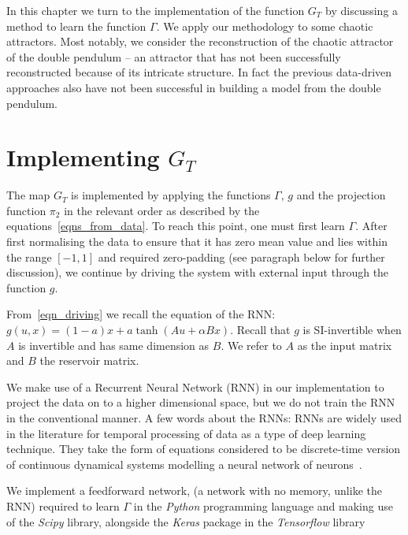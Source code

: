 In this chapter we turn to the implementation of the function $G_T$ by discussing a method to learn the function $\Gamma$. We apply our methodology to some chaotic attractors. Most notably, we consider the reconstruction of the chaotic attractor of the double pendulum -- an  attractor that has not been successfully reconstructed because of its intricate structure. In fact the previous data-driven approaches also have not been successful in building a model from the double pendulum. 


\section{Implementing $G_T$}
The map $G_T$ is implemented by applying the functions $\Gamma$, $g$ and the projection function $\pi_2$ in the relevant order as described by the equations~\ref{eqns_from_data}. To reach this point, one must first learn $\Gamma$.
After first normalising the data to ensure that it has zero mean value and lies within the range $[-1,1]$ and required zero-padding (see paragraph below for further discussion), we continue by driving the system with external input through the function $g$.

From~\eqref{eqn_driving} we recall the equation of the RNN: $g(u,x) = (1-a) x + a \tanh(Au + \alpha B x)$. Recall that $g$ is SI-invertible when $A$ is invertible and has same dimension as $B$. We refer to $A$ as the input matrix and $B$ the reservoir matrix. 

We make use of a Recurrent Neural Network (RNN) in our implementation to project the data on to a higher dimensional space, but we do not train the RNN in the conventional manner.  A few words about the RNNs: RNNs are widely used in the literature for temporal processing of data as a type of deep learning technique. They take the form of equations considered to be discrete-time version of continuous dynamical systems modelling a neural network of neurons~\cite{jaeger2001echo}.

We implement a feedforward network, (a network with no memory, unlike the RNN) required to learn $\Gamma$ in the \emph{Python} programming language and making use of the \emph{Scipy} library, alongside the \emph{Keras} package in the \emph{Tensorflow} library 

